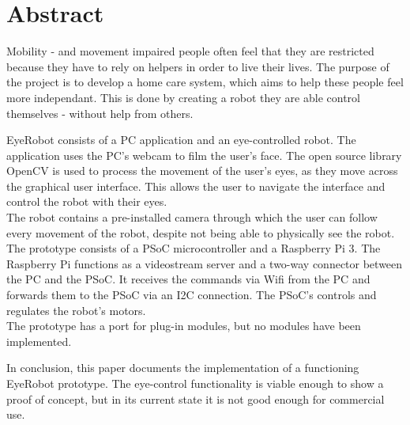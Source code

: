 
%


%
\chapter{Abstract}
Mobility - and movement impaired people often feel that they are restricted because they have to rely on helpers in order to live their lives.
The purpose of the project is to develop a home care system, which aims to help these people feel more independant. This is done by creating a robot they are able control themselves - without help from others.

EyeRobot consists of a PC application and an eye-controlled robot. The application uses the PC's webcam to film the user's face. The open source library OpenCV is used to process the movement of the user's eyes, as they move across the graphical user interface. This allows the user to navigate the interface and control the robot with their eyes.\\
The robot contains a pre-installed camera through which the user can follow every movement of the robot, despite not being able to physically see the robot. \\
The prototype consists of a PSoC microcontroller and a Raspberry Pi 3. The Raspberry Pi functions as a videostream server and a two-way connector between the PC and the PSoC. It receives the commands via Wifi from the PC and forwards them to the PSoC via an I2C connection. The PSoC's controls and regulates the robot's motors. \\
The prototype has a port for plug-in modules, but no modules have been implemented.

In conclusion, this paper documents the implementation of a functioning EyeRobot prototype. The eye-control functionality is viable enough to show a proof of concept, but in its current state it is not good enough for commercial use.


%